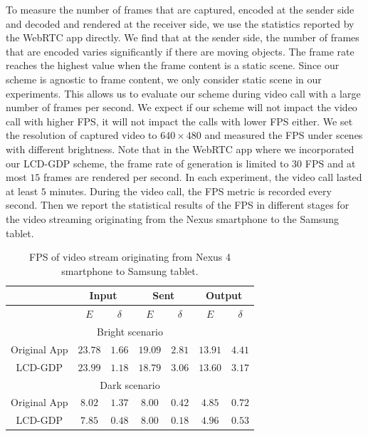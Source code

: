 To measure the number of frames that are captured, encoded at the
sender side and decoded and rendered at the receiver side, we use the
statistics reported by the WebRTC app directly. We find that at the
sender side, the number of frames that are encoded varies
significantly if there are moving objects.  The frame rate reaches the
highest value when the frame content is a static scene.  Since our
scheme is agnostic to frame content, we only consider static scene in
our experiments.  This allows us to evaluate our scheme during video
call with a large number of frames per second.  We expect if our scheme
will not impact the video call with higher FPS, it will not impact the
calls with lower FPS either.  We set the resolution of captured video
to $640\times 480$ and measured the FPS under scenes with different
brightness.  Note that in the WebRTC app where we incorporated our
LCD-GDP scheme, the frame rate of generation is limited to $30$ FPS
and at most $15$ frames are rendered per second. In each experiment,
the video call lasted at least $5$ minutes. 
During the video call, the FPS metric is recorded every second. 
Then we report the statistical results of the FPS in different stages for the
video streaming originating from the Nexus smartphone to the Samsung tablet.



\begin{table}[t]
  \small
  \centering
  \caption{FPS of video stream originating from Nexus 4 smartphone to
    Samsung tablet.}
	\vspace{0.5em}
  \label{tab:fps}
  \begin{tabular}{|c||c|c||c|c||c|c|} %
    \hline
    & \multicolumn{2}{|c||}{Input} & \multicolumn{2}{|c||}{Sent}
    & \multicolumn{2}{|c|}{Output}
    \\ \hline
    & $E$ & $\delta$ & $E$ & $\delta$ & $E$ & $\delta$ \\ \hline
    \multicolumn{7}{|c|}{Bright scenario} \\ \hline
    Original App & $23.78$ & $1.66$ & $19.09$ & $2.81$ & $13.91$ & $4.41$ 
    \\ \hline
    LCD-GDP & $23.99$ & $1.18$ & $18.79$ & $3.06$ & $13.60$ & $3.17$
    \\ \hline
    \multicolumn{7}{|c|}{Dark scenario} \\ \hline
    Original App & $8.02$ & $1.37$ & $8.00$ & $0.42$ & $4.85$ & $0.72$ \\ \hline
    LCD-GDP & $7.85$ & $0.48$ & $8.00$ & $0.18$ & $4.96$ & $0.53$ \\ \hline
  \end{tabular}
\end{table}


